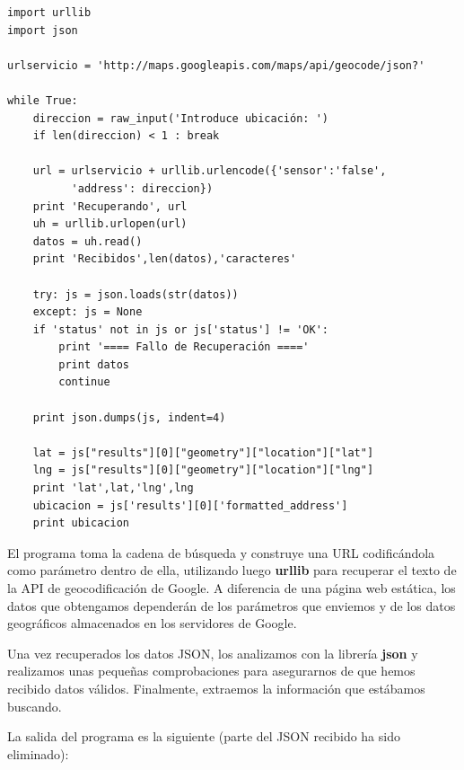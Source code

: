 \beforeverb
\begin{verbatim}
import urllib
import json

urlservicio = 'http://maps.googleapis.com/maps/api/geocode/json?'

while True:
    direccion = raw_input('Introduce ubicación: ')
    if len(direccion) < 1 : break

    url = urlservicio + urllib.urlencode({'sensor':'false', 
          'address': direccion})
    print 'Recuperando', url
    uh = urllib.urlopen(url)
    datos = uh.read()
    print 'Recibidos',len(datos),'caracteres'

    try: js = json.loads(str(datos))
    except: js = None
    if 'status' not in js or js['status'] != 'OK':
        print '==== Fallo de Recuperación ===='
        print datos
        continue

    print json.dumps(js, indent=4)

    lat = js["results"][0]["geometry"]["location"]["lat"]
    lng = js["results"][0]["geometry"]["location"]["lng"]
    print 'lat',lat,'lng',lng
    ubicacion = js['results'][0]['formatted_address']
    print ubicacion
\end{verbatim}
\afterverb
%
El programa toma la cadena de búsqueda y construye una URL
codificándola como parámetro dentro de ella, utilizando luego
{\bf urllib} para recuperar el texto de la API de geocodificación de Google.
A diferencia de una página web estática, los datos que obtengamos dependerán de los
parámetros que enviemos y de los datos geográficos almacenados en los servidores de Google.

Una vez recuperados los datos JSON, los analizamos con la librería
{\bf json} y realizamos unas pequeñas comprobaciones para asegurarnos de que hemos recibido
datos válidos. Finalmente, extraemos la información que estábamos buscando.

La salida del programa es la siguiente (parte del JSON recibido
ha sido eliminado):

